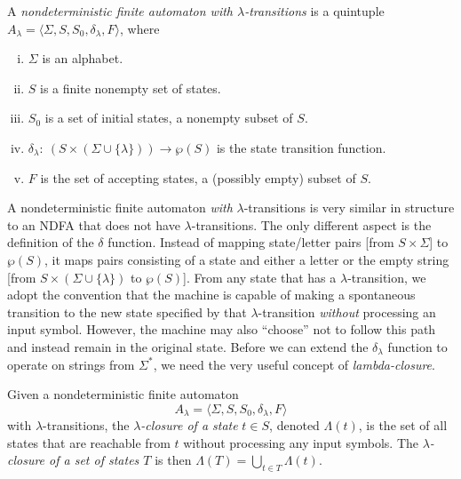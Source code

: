 \begin{dfn}\label{dfn-4.6}
A \emph{nondeterministic finite automaton with $\lambda$-transitions} is a
quintuple $A_{\lambda}=\langle\Sigma,S,S_0,\delta_{\lambda},F\rangle$, where
\begin{enumerate}[i.]
\item $\Sigma$ is an alphabet.
\item $S$ is a finite nonempty set of states.
\item $S_0$ is a set of initial states, a nonempty subset of $S$.
\item $\delta_\lambda:\ (S \times (\Sigma\cup\{\lambda\})) \rightarrow \wp(S)$
	is the state transition function.
\item $F$ is the set of accepting states, a (possibly empty) subset of $S$.
\end{enumerate}
\end{dfn}

A nondeterministic finite automaton \emph{with} $\lambda$-transitions is very
similar in structure to an NDFA that does not have $\lambda$-transitions. The
only different aspect is the definition of the $\delta$ function. Instead of
mapping state/letter pairs [from $S \times \Sigma$] to $\wp(S)$, it maps pairs
consisting of a state and either a letter or the empty string [from $S \times
(\Sigma\cup\{\lambda\})$ to $\wp(S)$]. From any state that has a
$\lambda$-transition, we adopt the convention that the machine is capable of
making a spontaneous transition to the new state specified by that
$\lambda$-transition \emph{without} processing an input symbol. However, the
machine may also ``choose'' not to follow this path and instead remain in the
original state. Before we can extend the $\delta_{\lambda}$ function to operate
on strings from $\Sigma^*$, we need the very useful concept of
\emph{lambda-closure}.

\begin{dfn}\label{dfn-4.7}
Given a nondeterministic finite automaton
\[ A_{\lambda} = \langle\Sigma,S,S_0,\delta_{\lambda},F\rangle \]
with $\lambda$-transitions, the \emph{$\lambda$-closure of a state} $t \in S$,
denoted $\Lambda(t)$, is the set of all states that are reachable from $t$
without processing any input symbols. The \emph{$\lambda$-closure of a
set of states $T$} is then $\Lambda(T) = \bigcup\limits_{t\in T} \Lambda(t)$.
\end{dfn}

